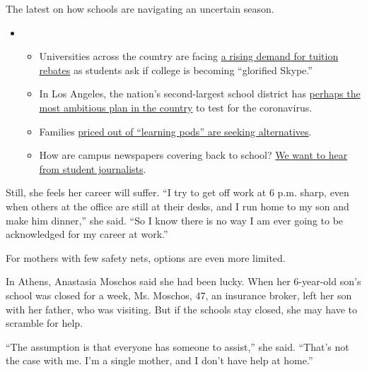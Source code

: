 The latest on how schools are navigating an uncertain season.

\begin{itemize}
\item
  \begin{itemize}
  \tightlist
  \item
    Universities across the country are facing
    \href{https://www.nytimes3xbfgragh.onion/2020/08/15/us/covid-college-tuition.html?action=click\&pgtype=Article\&state=default\&region=MAIN_CONTENT_3\&context=storylines_keepup}{a
    rising demand for tuition rebates} as students ask if college is
    becoming ``glorified Skype.''
  \item
    In Los Angeles, the nation's second-largest school district has
    \href{https://www.nytimes3xbfgragh.onion/2020/08/16/us/los-angeles-schools-virus-testing.html?action=click\&pgtype=Article\&state=default\&region=MAIN_CONTENT_3\&context=storylines_keepup}{perhaps
    the most ambitious plan in the country} to test for the coronavirus.
  \item
    Families
    \href{https://www.nytimes3xbfgragh.onion/2020/08/14/us/covid-schools-learning-pods.html?action=click\&pgtype=Article\&state=default\&region=MAIN_CONTENT_3\&context=storylines_keepup}{priced
    out of ``learning pods'' are seeking alternatives}.
  \item
    How are campus newspapers covering back to school?
    \href{https://www.nytimes3xbfgragh.onion/2020/08/17/us/student-newspaper-schools-reopening.html?action=click\&pgtype=Article\&state=default\&region=MAIN_CONTENT_3\&context=storylines_keepup}{We
    want to hear from student journalists}.
  \end{itemize}
\end{itemize}

Still, she feels her career will suffer. ``I try to get off work at 6
p.m. sharp, even when others at the office are still at their desks, and
I run home to my son and make him dinner,'' she said. ``So I know there
is no way I am ever going to be acknowledged for my career at work.''

For mothers with few safety nets, options are even more limited.

In Athens, Anastasia Moschos said she had been lucky. When her
6-year-old son's school was closed for a week, Ms. Moschos, 47, an
insurance broker, left her son with her father, who was visiting. But if
the schools stay closed, she may have to scramble for help.

``The assumption is that everyone has someone to assist,'' she said.
``That's not the case with me. I'm a single mother, and I don't have
help at home.''

